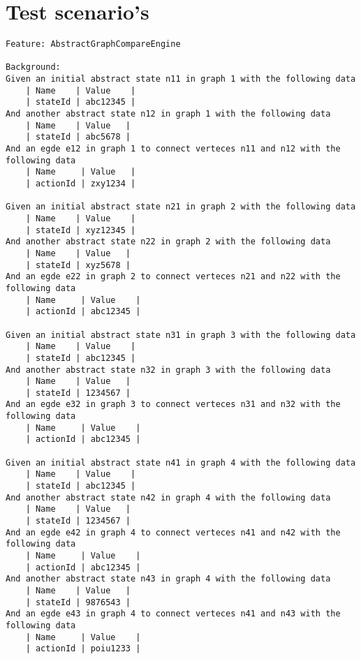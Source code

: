 \chapter{Test scenario's} \label{appendix:test-scenarios}

\begin{lstlisting}[language=Gherkin, caption=Test Scenario's, label=code:gherkin-tests]
Feature: AbstractGraphCompareEngine

Background:
Given an initial abstract state n11 in graph 1 with the following data
    | Name    | Value    |
    | stateId | abc12345 |
And another abstract state n12 in graph 1 with the following data
    | Name    | Value   |
    | stateId | abc5678 |
And an egde e12 in graph 1 to connect verteces n11 and n12 with the following data
    | Name     | Value   |
    | actionId | zxy1234 |

Given an initial abstract state n21 in graph 2 with the following data
    | Name    | Value    |
    | stateId | xyz12345 |
And another abstract state n22 in graph 2 with the following data
    | Name    | Value   |
    | stateId | xyz5678 |
And an egde e22 in graph 2 to connect verteces n21 and n22 with the following data
    | Name     | Value    |
    | actionId | abc12345 |

Given an initial abstract state n31 in graph 3 with the following data
    | Name    | Value    |
    | stateId | abc12345 |
And another abstract state n32 in graph 3 with the following data
    | Name    | Value   |
    | stateId | 1234567 |
And an egde e32 in graph 3 to connect verteces n31 and n32 with the following data
    | Name     | Value    |
    | actionId | abc12345 |

Given an initial abstract state n41 in graph 4 with the following data
    | Name    | Value    |
    | stateId | abc12345 |
And another abstract state n42 in graph 4 with the following data
    | Name    | Value   |
    | stateId | 1234567 |
And an egde e42 in graph 4 to connect verteces n41 and n42 with the following data
    | Name     | Value    |
    | actionId | abc12345 |
And another abstract state n43 in graph 4 with the following data
    | Name    | Value   |
    | stateId | 9876543 |
And an egde e43 in graph 4 to connect verteces n41 and n43 with the following data
    | Name     | Value    |
    | actionId | poiu1233 | 


\end{lstlisting}
